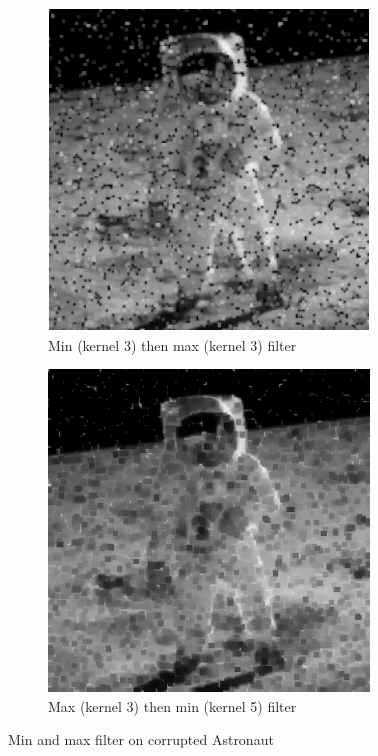 \documentclass{article}
\begin{document}
\begin{figure}[H]
	\begin{subfigure}{0.4\textwidth}
		\includegraphics[width=\textwidth]{Generated/Astronaut_salt_pepper_min3max3filter.png}
		\caption{Min (kernel 3) then max (kernel 3) filter}
	\end{subfigure}
	\hfill
	\begin{subfigure}{0.4\textwidth}
		\includegraphics[width=\textwidth]{Generated/Astronaut_salt_pepper_max3min5filter.png}
		\caption{Max (kernel 3) then min (kernel 5) filter}
	\end{subfigure}
	\caption{Min and max filter on corrupted Astronaut}
	\label{fig:min_max_Astronaut}
\end{figure}
\end{document}
